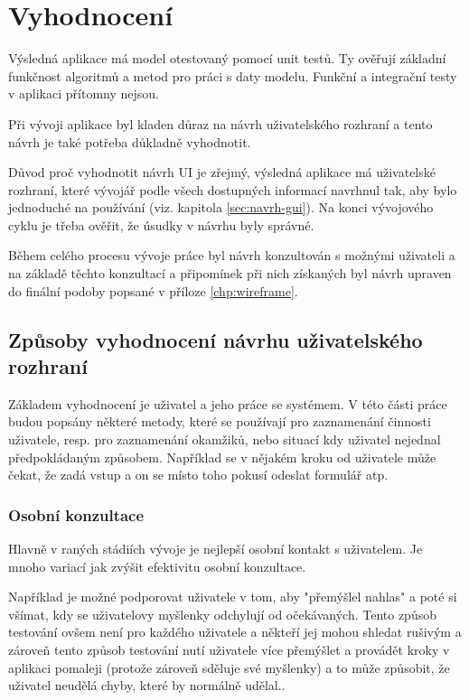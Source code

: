 \chapter{Vyhodnocení}
Výsledná aplikace má model otestovaný pomocí unit testů. Ty ověřují základní funkčnost algoritmů a metod pro práci s daty modelu. Funkční a integrační testy v aplikaci přítomny nejsou.

Při vývoji aplikace byl kladen důraz na návrh uživatelského rozhraní a tento návrh je také potřeba důkladně vyhodnotit.

Důvod proč vyhodnotit návrh UI je zřejmý, výsledná aplikace má uživatelské rozhraní, které vývojář podle všech dostupných informací navrhnul tak, aby bylo jednoduché na používání (viz. kapitola \ref{sec:navrh-gui}). Na konci vývojového cyklu je třeba ověřit, že úsudky v návrhu byly správné.  

Během celého procesu vývoje práce byl návrh konzultován s možnými uživateli a na základě těchto konzultací a připomínek při nich získaných byl návrh upraven do finální podoby popsané v příloze \ref{chp:wireframe}.

\section{Způsoby vyhodnocení návrhu uživatelského rozhraní}
Základem vyhodnocení je uživatel a jeho práce se systémem. V této části práce budou popsány některé metody, které se používají pro zaznamenání činnosti uživatele, resp. pro zaznamenání okamžiků, nebo situací kdy uživatel nejednal předpokládaným způsobem. Například se v nějakém kroku od uživatele může čekat, že zadá vstup a on se místo toho pokusí odeslat formulář atp.

\subsection{Osobní konzultace}
Hlavně v raných stádiích vývoje je nejlepší osobní kontakt s uživatelem\cite{stone2005user}. Je mnoho variací jak zvýšit efektivitu osobní konzultace.

Například je možné podporovat uživatele v tom, aby "přemýšlel nahlas" a poté si všímat, kdy se uživatelovy myšlenky odchylují od očekávaných. Tento způsob testování ovšem není pro každého uživatele a někteří jej mohou shledat rušivým a zároveň tento způsob testování nutí uživatele více přemýšlet a provádět kroky v aplikaci pomaleji (protože zároveň sděluje své myšlenky) a to může způsobit, že uživatel neudělá chyby, které by normálně udělal.\cite{stone2005user}.

